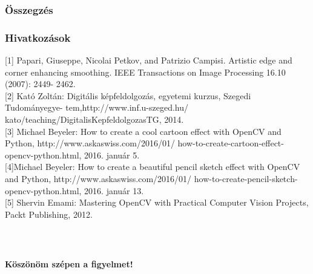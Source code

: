 \documentclass{beamer}
\begin{document}
\begin{frame}[fragile]
\frametitle{Összegzés}

\end{frame}

\begin{frame}[fragile]
\frametitle{Hivatkozások}

[1] Papari, Giuseppe, Nicolai Petkov, and Patrizio Campisi. Artistic edge and corner enhancing smoothing. IEEE Transactions on Image Processing 16.10 (2007): 2449- 2462.\\

[2] Kató Zoltán: Digitális képfeldolgozás, egyetemi kurzus, Szegedi Tudományegye- tem,http://www.inf.u-szeged.hu/ kato/teaching/DigitalisKepfeldolgozasTG, 2014.\\

[3] Michael Beyeler: How to create a cool cartoon effect with OpenCV and Python, http://www.askaswiss.com/2016/01/ how-to-create-cartoon-effect-opencv-python.html, 2016. január 5.\\

[4]Michael Beyeler: How to create a beautiful pencil sketch effect with OpenCV and Python, http://www.askaswiss.com/2016/01/ how-to-create-pencil-sketch-opencv-python.html, 2016. január 13.\\

[5] Shervin Emami: Mastering OpenCV with Practical Computer Vision Projects, Packt Publishing, 2012.
\end{frame}

\begin{frame}[fragile]
    \frametitle{\ }

\begin{center}
\Large \textbf{Köszönöm szépen a figyelmet!}
\end{center}

\end{frame}
\end{document}
